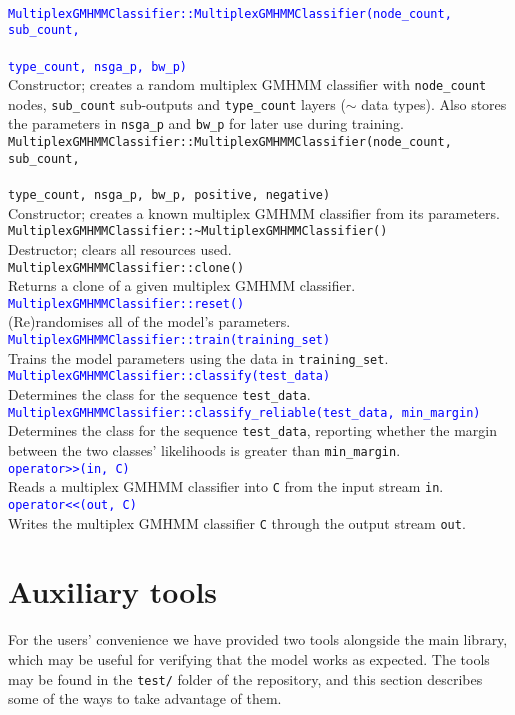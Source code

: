 \documentclass[12pt]{article}
\newcommand{\fundef}[1]{\\\indent\indent\texttt{#1}\\}
\begin{document}
	\hfill\vspace*{-10pt}\fundef{\textcolor{blue}{MultiplexGMHMMClassifier::MultiplexGMHMMClassifier(node\_count, sub\_count,}}\vspace*{-15pt}\fundef{\textcolor{blue}{type\_count, nsga\_p, bw\_p)}}
	Constructor; creates a random multiplex GMHMM classifier with {\tt node\_count} nodes, {\tt sub\_count} sub-outputs and {\tt type\_count} layers ($\sim$ data types). Also stores the parameters in {\tt nsga\_p} and {\tt bw\_p} for later use during training.
	\fundef{MultiplexGMHMMClassifier::MultiplexGMHMMClassifier(node\_count, sub\_count,}\vspace*{-15pt}\fundef{type\_count, nsga\_p, bw\_p, positive, negative)}
	Constructor; creates a known multiplex GMHMM classifier from its parameters.
	\fundef{MultiplexGMHMMClassifier::\textasciitilde MultiplexGMHMMClassifier()}
	Destructor; clears all resources used.
	\fundef{MultiplexGMHMMClassifier::clone()}
	Returns a clone of a given multiplex GMHMM classifier.
	\fundef{\textcolor{blue}{MultiplexGMHMMClassifier::reset()}}
	(Re)randomises all of the model's parameters.
	\fundef{\textcolor{blue}{MultiplexGMHMMClassifier::train(training\_set)}}
	Trains the model parameters using the data in {\tt training\_set}.
	\fundef{\textcolor{blue}{MultiplexGMHMMClassifier::classify(test\_data)}}
	Determines the class for the sequence {\tt test\_data}.
	\fundef{\textcolor{blue}{MultiplexGMHMMClassifier::classify\_reliable(test\_data, min\_margin)}}
	Determines the class for the sequence {\tt test\_data}, reporting whether the margin between the two classes' likelihoods is greater than {\tt min\_margin}.
	\fundef{\textcolor{blue}{operator>\/>(in, C)}}
	Reads a multiplex GMHMM classifier into {\tt C} from the input stream {\tt in}.
	\fundef{\textcolor{blue}{operator<\/<(out, C)}}
	Writes the multiplex GMHMM classifier {\tt C} through the output stream {\tt out}.
	
	\section{Auxiliary tools}\label{sec:auxx}
	For the users' convenience we have provided two tools alongside the main library, which may be useful for verifying that the model works as expected. The tools may be found in the {\tt test/} folder of the repository, and this section describes some of the ways to take advantage of them.
\end{document}
